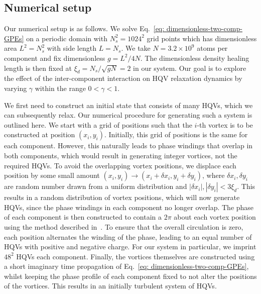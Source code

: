 \subsection{Numerical setup}\label{sec:numerical-setup}
Our numerical setup is as follows.
We solve Eq.~\eqref{eq: dimensionless-two-comp-GPEs} on a periodic domain with
\(N_s^2=1024^2\) grid points which has dimensionless area \(L^2=N_s^2\) with
side length \(L=N_s\).
We take \(N=3.2\times10^9\) atoms per component and fix dimensionless
\(g=L^2/4N\).
The dimensionless density healing length is then fixed at
\(\xi_d=N_s/\sqrt{gN}=2\) in our system.
Our goal is to explore the effect of the inter-component interaction on HQV
relaxation dynamics by varying \(\gamma \) within the range \(0 < \gamma < 1\).

We first need to construct an initial state that consists of many HQVs, which we
can subsequently relax.
Our numerical procedure for generating such a system is outlined here.
We start with a grid of positions such that the \(i\)-th vortex is to be
constructed at position \((x_i, y_i)\).
Initially, this grid of positions is the same for each component.
However, this naturally leads to phase windings that overlap in both components,
which would result in generating integer vortices, not the required HQVs.
To avoid the overlapping vortex positions, we displace each position by some
small amount \((x_i, y_i) \rightarrow (x_i + \delta x_i, y_i + \delta y_i)\),
where \(\delta x_i, \delta y_i\) are random number drawn from a uniform
distribution and \(|\delta x_i|, |\delta y_i| < 3\xi_d\).
This results in a random distribution of vortex positions, which will now
generate HQVs, since the phase windings in each component no longer overlap.
The phase of each component is then constructed to contain a \( 2\pi \) about
each vortex position using the method described in~\cite{Billam2014}.
To ensure that the overall circulation is zero, each position alternates the
winding of the phase, leading to an equal number of HQVs with positive and
negative charge.
For our system in particular, we imprint \(48^2\) HQVs each component.
Finally, the vortices themselves are constructed using a short imaginary time
propagation of Eq.~\eqref{eq: dimensionless-two-comp-GPEs}, whilst keeping the
phase profile of each component fixed to not alter the positions of the
vortices.
This results in an initially turbulent system of HQVs.

